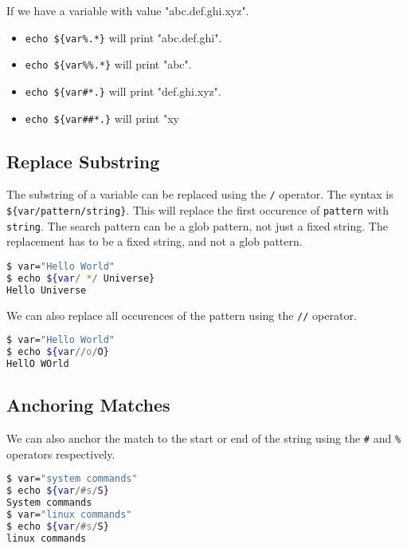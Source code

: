 If we have a variable with value "abc.def.ghi.xyz".
\begin{itemize}
  \item \lstinline|echo ${var%.*}| will print "abc.def.ghi".
  \item \lstinline|echo ${var%%.*}| will print "abc".
  \item \lstinline|echo ${var#*.}| will print "def.ghi.xyz".
  \item \lstinline|echo ${var##*.}| will print "xy
\end{itemize}

\subsection{Replace Substring}

The substring of a variable can be replaced using the \lstinline{/} operator.
The syntax is \lstinline|${var/pattern/string}|. This will replace the first occurence of \lstinline{pattern} with \lstinline{string}.
The search pattern can be a glob pattern, not just a fixed string.
The replacement has to be a fixed string, and not a glob pattern.

\begin{lstlisting}[language=bash]
$ var="Hello World"
$ echo ${var/ */ Universe}
Hello Universe
\end{lstlisting}

We can also replace all occurences of the pattern using the \lstinline{//} operator.

\begin{lstlisting}[language=bash]
$ var="Hello World"
$ echo ${var//o/O}
HellO WOrld
\end{lstlisting}

\subsection{Anchoring Matches}

We can also anchor the match to the start or end of the string using the \lstinline{#} and \lstinline{%} operators respectively.

\begin{lstlisting}[language=bash]
$ var="system commands"
$ echo ${var/#s/S}
System commands
$ var="linux commands"
$ echo ${var/#s/S}
linux commands
\end{lstlisting}

